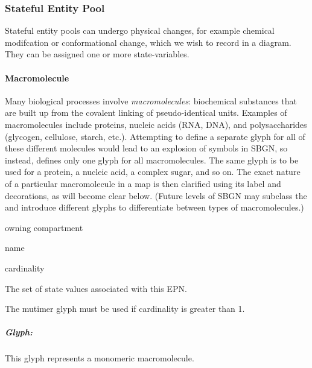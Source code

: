 \subsubsection{Stateful Entity Pool}

Stateful entity pools can undergo physical changes, for example chemical
modifcation or conformational change, which we wish to record in a \PD
diagram. They can be assigned one or more state-variables.

\paragraph{Macromolecule}
\label{sec:macromolecule}

Many biological processes involve \emph{macromolecules}: biochemical substances that are built up from the covalent linking of pseudo-identical units.  Examples of macromolecules include proteins, nucleic acids (RNA, DNA), and polysaccharides (glycogen, cellulose, starch, etc.).  Attempting to define a separate glyph for all of these different molecules would lead to an explosion of symbols in SBGN, so instead, \SBGNPDLone defines only one glyph for all macromolecules.  The same glyph is to be used for a protein, a nucleic acid, a complex sugar, and so on.  The exact nature of a particular macromolecule in a map is then clarified using its label and decorations, as will become clear below.  (Future levels of SBGN may subclass the  and introduce different glyphs to differentiate between types of macromolecules.)

\begin{glyphDescription}
 \begin{glyphIdentity}
  \item owning compartment
  \item name
  \item cardinality
  \item The set of state values associated with this EPN.
  \end{glyphIdentity}
  \glyphRules The mutimer glyph
  must be used if cardinality is greater than 1.
\end{glyphDescription}

\subparagraph{Glyph: }

This glyph represents a monomeric macromolecule.

